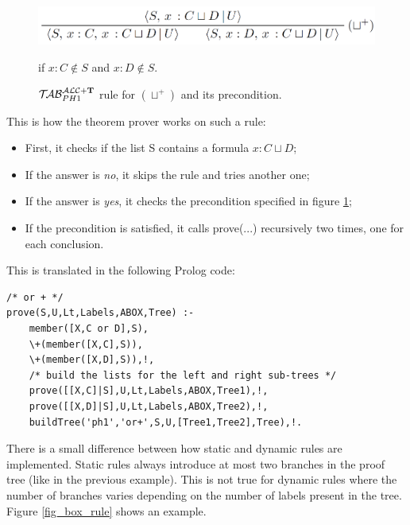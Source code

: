 \documentclass[a4paper, 11pt, oneside]{duthesis}
\newcommand{\tip}{{\bf T}}
\newcommand{\primo}{\mathrel{{\mathcal{T}\!\mathcal{AB}}}_{PH 1}^{\mathcal{ALC}+\mbox{\scriptsize $\tip$}}}
\begin{document}
\begin{figure}[htp]
\begin{center}\includegraphics[scale=1.00]{img/union_rule.png}\end{center} %
	\begin{flushright}if $x : C \notin S$ and $x : D \notin S$.\\\end{flushright}
	\caption{$\primo$ rule for $(\sqcup^+)$ and its precondition.}
	\label{fig_union_rule}
\end{figure}

This is how the theorem prover works on such a rule:

\begin{itemize}
\item First, it checks if the list S contains a formula $x : C \sqcup D$;
\item If the answer is \emph{no}, it skips the rule and tries another one;
\item If the answer is \emph{yes}, it checks the precondition specified in figure \ref{fig_union_rule};
\item If the precondition is satisfied, it calls prove(...) recursively two times, one for each conclusion.
\end{itemize}

This is translated in the following Prolog code:

\begin{lstlisting}[caption={alct1.pl}, label={lst:zaino}, firstnumber=175]
/* or + */
prove(S,U,Lt,Labels,ABOX,Tree) :-
    member([X,C or D],S),
    \+(member([X,C],S)),
    \+(member([X,D],S)),!,
    /* build the lists for the left and right sub-trees */
    prove([[X,C]|S],U,Lt,Labels,ABOX,Tree1),!,
    prove([[X,D]|S],U,Lt,Labels,ABOX,Tree2),!,
    buildTree('ph1','or+',S,U,[Tree1,Tree2],Tree),!.
\end{lstlisting}

There is a small difference between how static and dynamic rules are implemented.
Static rules always introduce at most two branches in the proof tree (like in the previous example).
This is not true for dynamic rules where the number of branches varies depending on the number of labels present in the tree.
Figure \ref{fig_box_rule} shows an example.
\end{document}
